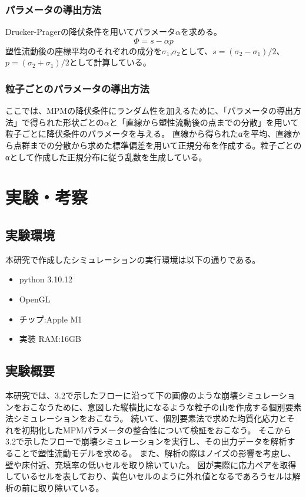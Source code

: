 \documentclass[12pt]{ltjsarticle}
\begin{document}
\subsubsection{パラメータの導出方法}
Drucker-Pragerの降伏条件を用いてパラメータ$\alpha$を求める。
\begin{equation}
  \Phi=s-\alpha p
\end{equation}
塑性流動後の座標平均のそれぞれの成分を$\sigma_1$,$\sigma_2$として、$s=(\sigma_2-\sigma_1)/2$、$p=(\sigma_2+\sigma_1)/2$として計算している。

\subsubsection{粒子ごとのパラメータの導出方法}
ここでは、MPMの降伏条件にランダム性を加えるために、「パラメータの導出方法」で得られた形状ごとの$\alpha$と「直線から塑性流動後の点までの分散」を用いて粒子ごとに降伏条件のパラメータを与える。
直線から得られたαを平均、直線から点群までの分散から求めた標準偏差を用いて正規分布を作成する。粒子ごとのαとして作成した正規分布に従う乱数を生成している。


\newpage

\section{実験・考察}
\subsection{実験環境}
本研究で作成したシミュレーションの実行環境は以下の通りである。
\begin{itemize}
  \item python 3.10.12
  \item OpenGL
  \item チップ:Apple M1
  \item 実装 RAM:16GB
\end{itemize}


\subsection{実験概要}
本研究では、3.2で示したフローに沿って下の画像のような崩壊シミュレーションをおこなうために、意図した縦横比になるような粒子の山を作成する個別要素法シミュレーションをおこなう。
続いて、個別要素法で求めた均質化応力とそれを初期化したMPMパラメータの整合性について検証をおこなう。
そこから3.2で示したフローで崩壊シミュレーションを実行し、その出力データを解析することで塑性流動モデルを求める。
また、解析の際はノイズの影響を考慮し、壁や床付近、充填率の低いセルを取り除いていた。
図が実際に応力ペアを取得しているセルを表しており、黄色いセルのように外れ値となるであろうセルは解析の前に取り除いている。
\end{document}
